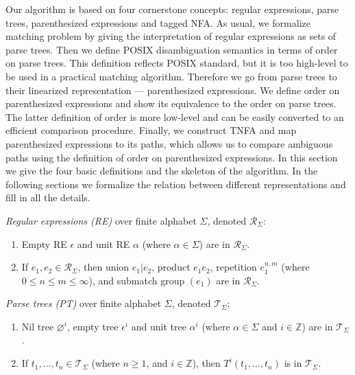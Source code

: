 \documentclass[AMA,STIX1COL]{WileyNJD-v2}
\newcommand{\XR}{\mathcal{R}}
\newcommand{\XT}{\mathcal{T}}
\newcommand{\YZ}{\mathbb{Z}}
\begin{document}
Our algorithm is based on four cornerstone concepts:
regular expressions, parse trees, parenthesized expressions and tagged NFA.
%
As usual, we formalize matching problem
by giving the interpretation of regular expressions as sets of parse trees.
%
Then we define POSIX disambiguation semantics in terms of order on parse trees.
This definition reflects POSIX standard,
but it is too high-level to be used in a practical matching algorithm.
%
Therefore we go from parse trees to their linearized representation --- parenthesized expressions.
We define order on parenthesized expressions and show its equivalence to the order on parse trees.
The latter definition of order is more low-level and can be easily converted to an efficient comparison procedure.
%
Finally, we construct TNFA and map parenthesized expressions to its paths,
which allows us to compare ambiguous paths using the definition of order on parenthesized expressions.
%
In this section we give the four basic definitions and the skeleton of the algorithm.
In the following sections we formalize the relation between different representations and fill in all the details.

    \begin{definition}
    \emph{Regular expressions (RE)} over finite alphabet $\Sigma$, denoted $\XR_\Sigma$:
    \begin{enumerate}
        \item
          Empty RE $\epsilon$ and
          unit RE $\alpha$ (where $\alpha \in \Sigma$) are in $\XR_\Sigma$.
        \item If $e_1, e_2 \in \XR_\Sigma$, then
          union $e_1 | e_2$,
          product $e_1 e_2$,
          repetition $e_1^{n, m}$ (where $0 \leq n \leq m \leq \infty$), and
          submatch group $(e_1)$
          are in $\XR_\Sigma$.
    \end{enumerate}
    \end{definition}


    \begin{definition}
    \emph{Parse trees (PT)} over finite alphabet $\Sigma$, denoted $\XT_\Sigma$:
    \begin{enumerate}
        \item
          Nil tree ${\varnothing}^i$,
          empty tree ${\epsilon}^i$ and
          unit tree ${\alpha}^i$ (where $\alpha \in \Sigma$ and $i \in \YZ$)
          are in $\XT_\Sigma$.
        \item If $t_1, \dots, t_n \in \XT_\Sigma$ (where $n \geq 1$, and $i \in \YZ$), then
          ${T}^i(t_1, \dots, t_n)$
          is in $\XT_\Sigma$.
    \end{enumerate}
    \end{definition}
\end{document}
